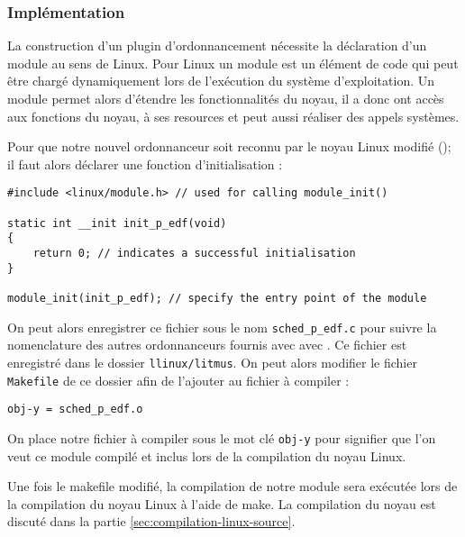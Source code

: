 \subsubsection{Implémentation}

La construction d'un plugin d'ordonnancement nécessite la déclaration d'un module au sens de Linux. Pour Linux un module est un élément de code qui peut être chargé dynamiquement lors de l’exécution du système d'exploitation. Un module permet alors d'étendre les fonctionnalités du noyau, il a donc ont accès aux fonctions du noyau, à ses resources et peut aussi réaliser des appels systèmes.

Pour que notre nouvel ordonnanceur soit reconnu par le noyau Linux modifié (\litmus); il faut alors déclarer une fonction d'initialisation :
\begin{lstlisting}[style=cstyle]
#include <linux/module.h> // used for calling module_init()

static int __init init_p_edf(void)
{
    return 0; // indicates a successful initialisation
}

module_init(init_p_edf); // specify the entry point of the module 
\end{lstlisting} 

On peut alors enregistrer ce fichier sous le nom \lstinline{sched_p_edf.c} pour suivre la nomenclature des autres ordonnanceurs fournis avec avec \litmus. Ce fichier est enregistré dans le dossier \lstinline{llinux/litmus}. On peut alors modifier le fichier \lstinline{Makefile} de ce dossier afin de l'ajouter au fichier à compiler :

\begin{lstlisting}[style=makefilestyle]  
    obj-y = sched_p_edf.o
\end{lstlisting}    

On place notre fichier à compiler sous le mot clé \texttt{obj-y} pour signifier que l'on veut ce module compilé et inclus lors de la compilation du noyau Linux.

Une fois le makefile modifié, la compilation de notre module sera exécutée lors de la compilation du noyau Linux à l'aide de make. La compilation du noyau est discuté dans la partie \ref{sec:compilation-linux-source}.

    